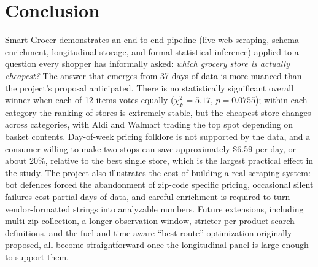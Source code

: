 \documentclass[11pt]{article}
\begin{document}
\section{Conclusion}

Smart Grocer demonstrates an end-to-end pipeline (live web scraping,
schema enrichment, longitudinal storage, and formal statistical
inference) applied to a question every shopper has informally asked:
\textit{which grocery store is actually cheapest?} The answer that
emerges from 37 days of data is more nuanced than the project's
proposal anticipated. There is no statistically significant overall
winner when each of 12 items votes equally
($\chi^2_F = 5.17$, $p = 0.0755$); within each category the ranking
of stores is extremely stable, but the cheapest store changes across
categories, with Aldi and Walmart trading the top spot depending on
basket contents. Day-of-week pricing folklore is not supported by the
data, and a consumer willing to make two stops can save approximately
\$6.59 per day, or about 20\%, relative to the best single store,
which is the largest practical effect in the study. The project also
illustrates the cost of building a real scraping system: bot defences
forced the abandonment of zip-code specific pricing, occasional
silent failures cost partial days of data, and careful enrichment is
required to turn vendor-formatted strings into analyzable numbers.
Future extensions, including multi-zip collection, a longer
observation window, stricter per-product search definitions, and the
fuel-and-time-aware ``best route'' optimization originally proposed,
all become straightforward once the longitudinal panel is large
enough to support them.
\end{document}
